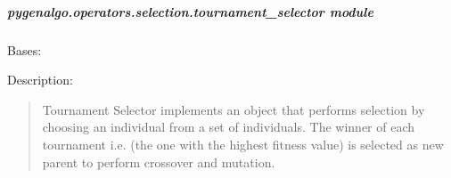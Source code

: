 \documentclass[letterpaper,10pt,english]{sphinxmanual}
\begin{document}
\subparagraph{pygenalgo.operators.selection.tournament\_selector module}
\label{\detokenize{pygenalgo.operators.selection:module-pygenalgo.operators.selection.tournament_selector}}\label{\detokenize{pygenalgo.operators.selection:pygenalgo-operators-selection-tournament-selector-module}}

\begin{fulllineitems}
\label{\detokenize{pygenalgo.operators.selection:pygenalgo.operators.selection.tournament_selector.TournamentSelector}}
\pysigstartsignatures
{}
\pysigstopsignatures
\sphinxAtStartPar
Bases: {\hyperref[\detokenize{pygenalgo.operators.selection:pygenalgo.operators.selection.select_operator.SelectionOperator}]{}}

\sphinxAtStartPar
Description:
\begin{quote}

\sphinxAtStartPar
Tournament Selector implements an object that performs selection by choosing
an individual from a set of individuals. The winner of each tournament i.e.
(the one with the highest fitness value) is selected as new parent to perform
crossover and mutation.
\end{quote}


\end{fulllineitems}
\end{document}
